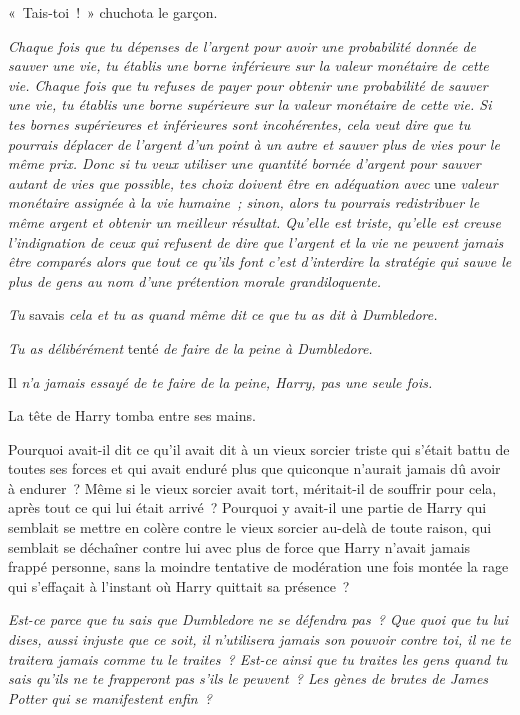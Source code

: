 «~Tais-toi~!~»
chuchota le garçon.

\emph{Chaque fois que tu dépenses de l'argent pour avoir une probabilité donnée de sauver une vie, tu établis une borne inférieure sur la valeur monétaire de cette vie.
Chaque fois que tu refuses de payer pour obtenir une probabilité de sauver une vie, tu établis une borne supérieure sur la valeur monétaire de cette vie.
Si tes bornes supérieures et inférieures sont incohérentes, cela veut dire que tu pourrais déplacer de l'argent d'un point à un autre et sauver plus de vies pour le même prix.
Donc si tu veux utiliser une quantité bornée d'argent pour sauver autant de vies que possible, tes choix doivent être en adéquation avec} une \emph{valeur monétaire assignée à la vie humaine~; sinon, alors tu pourrais redistribuer le même argent et obtenir un meilleur résultat.
Qu'elle est triste, qu'elle est creuse l'indignation de ceux qui refusent de dire que l'argent et la vie ne peuvent jamais être comparés alors que tout ce qu'ils font c'est d'interdire la stratégie qui sauve le plus de gens au nom d'une prétention morale grandiloquente.}

\emph{Tu} savais \emph{cela et tu as quand même dit ce que tu as dit à Dumbledore.}

\emph{Tu as délibérément} tenté \emph{de faire de la peine à Dumbledore.}

Il \emph{n'a jamais essayé de te faire de la peine, Harry, pas une seule fois.}

La tête de Harry tomba entre ses mains.

Pourquoi avait-il dit ce qu'il avait dit à un vieux sorcier triste qui s'était battu de toutes ses forces et qui avait enduré plus que quiconque n'aurait jamais dû avoir à endurer~?
Même si le vieux sorcier avait tort, méritait-il de souffrir pour cela, après tout ce qui lui était arrivé~?
Pourquoi y avait-il une partie de Harry qui semblait se mettre en colère contre le vieux sorcier au-delà de toute raison, qui semblait se déchaîner contre lui avec plus de force que Harry n'avait jamais frappé personne, sans la moindre tentative de modération une fois montée la rage qui s'effaçait à l'instant où Harry quittait sa présence~?

\emph{Est-ce parce que tu sais que Dumbledore ne se défendra pas~?
Que quoi que tu lui dises, aussi injuste que ce soit, il n'utilisera jamais son pouvoir contre toi, il ne te traitera jamais comme tu le traites~?
Est-ce ainsi que tu traites les gens quand tu sais qu'ils ne te frapperont pas s'ils le peuvent~?
Les gènes de brutes de James Potter qui se manifestent enfin~?}

